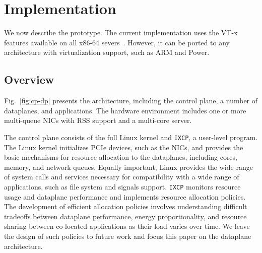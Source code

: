 
\section{\ix Implementation}
\label{sec:impl}



We now describe the \ix prototype.  The current implementation uses
the VT-x features available on all x86-64
severs~\cite{DBLP:journals/computer/UhligNRSMABKLS05}. However, it can
be ported to any architecture with virtualization support, such as ARM
and Power.




\subsection{Overview}
\label{sec:impl:overview}

Fig.~\ref{fig:cp-dp} presents the \ix architecture, including the
control plane, a number of dataplanes, and applications. The hardware
environment includes one or more multi-queue NICs with RSS support and
a multi-core server.

The \ix control plane consists of the full Linux kernel and
\texttt{IXCP}, a user-level program. The Linux kernel initializes PCIe
devices, such as the NICs, and provides the basic mechanisms for
resource allocation to the dataplanes, including cores, memory, and
network queues. Equally important, Linux provides the wide range of
system calls and services necessary for compatibility with a wide
range of applications, such as file system and signals
support. \texttt{IXCP} monitors resource usage and dataplane
performance and implements resource allocation policies. The
development of efficient allocation policies involves understanding
difficult tradeoffs between dataplane performance, energy
proportionality, and resource sharing between co-located applications
as their load varies over time. We leave the design of such policies
to future work and focus this paper on the \ix dataplane architecture.

